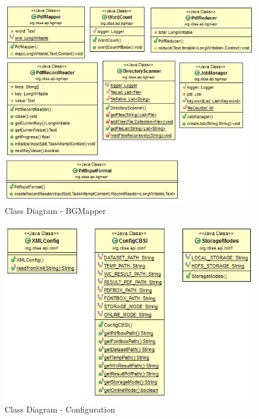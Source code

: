 \documentclass[oneside,a4paper,12pt]{report}
\begin{document}
{\begin{figure}[H]
\includegraphics{class-dig-bgmapper}
\caption{Class Diagram - BGMapper}
\end{figure}

\begin{figure}[H]
\includegraphics{class-dig-conf}
\caption{Class Diagram - Configuration}
\end{figure}

}
\end{document}
